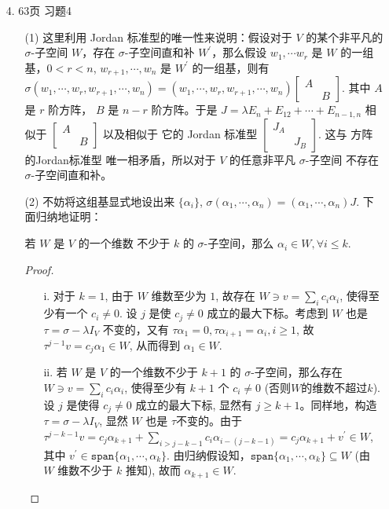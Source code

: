 \documentclass{article}
\begin{document}
\begin{spacing}{1.5}
\begin{enumerate}
    \item [4.] 63页 习题4
    
    \begin{itemize}
        \item [(1)] 这里利用 Jordan 标准型的唯一性来说明：假设对于 $V$ 的某个非平凡的 $\sigma$-子空间 $W$，存在 $\sigma$-子空间直和补 $W^\prime$，那么假设 $w_1, \cdots w_r$ 是 $W$ 的一组基，$0<r<n$, $w_{r+1}, \cdots, w_n$ 是 $W^\prime$ 的一组基，则有 $\sigma (w_1, \cdots, w_r, w_{r+1},\cdots, w_n) = (w_1, \cdots, w_r, w_{r+1},\cdots, w_n)\left[\begin{array}{cc}A&\\&B\end{array}\right]$. 其中 $A$ 是 $r$ 阶方阵， $B$ 是 $n-r$ 阶方阵。于是 $J = \lambda E_n + E_{12} + \cdots + E_{n-1,n}$ 相似于 $\left[\begin{array}{cc}A&\\&B\end{array}\right]$ 以及相似于 它的 Jordan 标准型 $\left[\begin{array}{cc}J_A&\\&J_B\end{array}\right]$. 这与 方阵的Jordan标准型 唯一相矛盾，所以对于 $V$ 的任意非平凡 $\sigma$-子空间 不存在 $\sigma$-子空间直和补。
        \item [(2)] 不妨将这组基显式地设出来 $\{\alpha_i\}$, $\sigma(\alpha_1, \cdots, \alpha_n) = (\alpha_1,\cdots,\alpha_n) J$. 下面归纳地证明：
        
        若 $W$ 是 $V$ 的一个维数 不少于 $k$ 的 $\sigma$-子空间，那么 $\alpha_i \in W, \forall i\leq k$.

        \begin{proof}
            ~\\
            \begin{itemize}
                \item [i.] 对于 $k=1$, 由于 $W$ 维数至少为 $1$, 故存在 $W \ni v = \sum_i c_i \alpha_i$, 使得至少有一个 $c_i\ne 0$. 设 $j$ 是使 $c_j\ne 0$ 成立的最大下标。考虑到 $W$ 也是 $\tau = \sigma - \lambda I_V$ 不变的，又有 $\tau \alpha_1 = 0, \tau \alpha_{i+1} = \alpha_i, i\geq 1$, 故 $\tau^{j-1} v = c_j\alpha_1 \in W$, 从而得到 $\alpha_1 \in W$.
                \item [ii.] 若 $W$ 是 $V$ 的一个维数不少于 $k+1$ 的 $\sigma$-子空间，那么存在 $W\ni v = \sum_i c_i\alpha_i$, 使得至少有 $k+1$ 个 $c_i\ne 0$ (否则$W$的维数不超过$k$). 设 $j$ 是使得 $c_j\ne 0$ 成立的最大下标, 显然有 $j\geq k+1$。同样地，构造 $\tau = \sigma - \lambda I_V$, 显然 $W$ 也是 $\tau$不变的。由于 $\tau^{j-k-1} v = c_j \alpha_{k+1} + \sum_{i > j - k - 1} c_i\alpha_{i - (j - k - 1)} = c_j\alpha_{k+1} + v^\prime\in W$, 其中 $v^\prime \in \mathtt{span}\{\alpha_1,\cdots, \alpha_k\}$. 由归纳假设知，$\mathtt{span}\{\alpha_1,\cdots, \alpha_k\} \subseteq W$ (由 $W$ 维数不少于 $k$ 推知), 故而 $\alpha_{k+1}\in W$.
            \end{itemize}
        \end{proof}


\end{itemize}
\end{enumerate}
\end{spacing}
\end{document}

